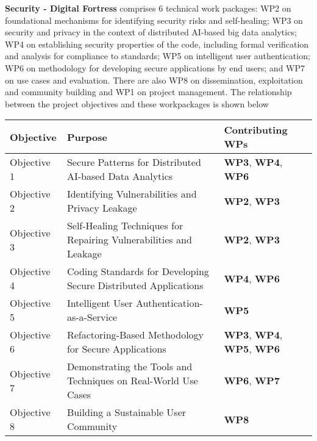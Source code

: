 \documentclass[a4paper,11pt]{article}
\newcommand{\project}[1]{\textbf{#1}\xspace}
\newcommand{\SECURITY}{\project{Security - Digital Fortress}}
\newcommand{\TheProject}{\SECURITY}
\begin{document}

\TheProject{} comprises 6 technical work packages: WP2 on foundational mechanisms for identifying security risks and self-healing; WP3 on security and privacy in the context of distributed AI-based big data analytics; WP4 on establishing security properties of the code, including formal verification and analysis for compliance to standards;  WP5 on intelligent user authentication; WP6 on methodology for developing secure applications by end users; and WP7 on use cases and evaluation. There are also WP8 on dissemination, exploitation and community building and WP1 on project management. The relationship between the project objectives and these workpackages is shown below

\vspace{-8pt}
\begin{center}
\begin{tabular}{|l|l|l|}\hline
\textbf{Objective} & \textbf{Purpose} & \textbf{Contributing WPs} \\\hline \hline
Objective 1 & Secure Patterns for Distributed AI-based Data Analytics & \textbf{WP3}, \textbf{WP4}, \textbf{WP6} \\\hline
Objective 2 & Identifying Vulnerabilities and Privacy Leakage & \textbf{WP2}, \textbf{WP3} \\\hline
Objective 3 & Self-Healing Techniques for Repairing Vulnerabilities and Leakage & \textbf{WP2}, \textbf{WP3} \\\hline
Objective 4 & Coding Standards for Developing Secure Distributed Applications & \textbf{WP4}, \textbf{WP6} \\\hline
Objective 5 & Intelligent User Authentication-as-a-Service & \textbf{WP5} \\\hline
Objective 6 & Refactoring-Based Methodology for Secure Applications & \textbf{WP3}, \textbf{WP4}, \textbf{WP5}, \textbf{WP6} \\\hline
Objective 7 & Demonstrating the Tools and Techniques on Real-World Use Cases & \textbf{WP6}, \textbf{WP7}\\\hline
Objective 8 & Building a Sustainable User Community & \textbf{WP8}\\\hline
\end{tabular}
\end{center}
\end{document}
